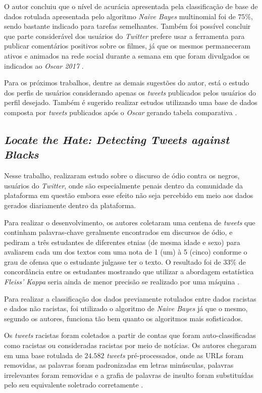 O autor concluiu que o nível de acurácia apresentada pela classificação de base de dados rotulada apresentada pelo algoritmo \textit{Naive Bayes} multinomial foi de $75\%$, sendo bastante indicado para tarefas semelhantes. Também foi possível concluir que parte considerável dos usuários do \textit{Twitter} prefere usar a ferramenta para publicar comentários positivos sobre os filmes, já que os mesmos permaneceram ativos e animados na rede social durante a semana em que foram divulgados os indicados ao \textit{Oscar 2017} \cite{Correa2017}.

Para os próximos trabalhos, dentre as demais sugestões do autor, está o estudo dos perfis de usuários considerando apenas os \textit{tweets} publicados pelos usuários do perfil desejado. Também é sugerido realizar estudos utilizando uma base de dados composta por \textit{tweets} publicados após o \textit{Oscar} gerando tabela comparativa \cite{Correa2017}.

\subsection{\textit{Locate the Hate: Detecting Tweets against Blacks}}

Nesse trabalho,  realizaram estudo sobre o discurso de ódio contra os negros, usuários do \textit{Twitter}, onde são especialmente penais dentro da comunidade da plataforma em questão embora esse efeito não seja percebido em meio aos dados gerados diariamente dentro da plataforma.

Para realizar o desenvolvimento, os autores coletaram uma centena de \textit{tweets} que continham palavras-chave geralmente encontrados em discursos de ódio, e pediram a três estudantes de diferentes etnias (de mesma idade e sexo) para avaliarem cada um dos textos com uma nota de 1 (um) à 5 (cinco) conforme o grau de ofensa que o estudante julgasse ter o texto. O resultado foi de $33\%$ de concordância entre os estudantes mostrando que utilizar a abordagem estatística \textit{Fleiss' Kappa} seria ainda de menor precisão se realizado por uma máquina \cite{kwok2013locate}.

Para realizar a classificação dos dados previamente rotulados entre dados racistas e dados não racistas, foi utilizado o algoritmo de \textit{Naive Bayes} já que o mesmo, segundo os autores, funciona tão bem quanto os algoritmos mais sofisticados.

Os \textit{tweets} racistas foram coletados a partir de contas que foram auto-classificadas como racistas ou consideradas racistas por meio de notícias. Os autores chegaram em uma base rotulada de $24.582$ \textit{tweets} pré-processados, onde as URLs foram removidas, as palavras foram padronizadas em letras minúsculas, palavras irrelevantes foram removidas e a grafia de palavras de insulto foram substituídas pelo seu equivalente soletrado corretamente \cite{kwok2013locate}.

